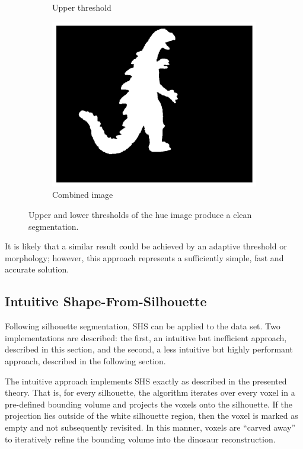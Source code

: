 \begin{figure}[ht]
\begin{subfigure}[b]{0.25\textwidth}
    \caption{Upper threshold}
  \end{subfigure}
  \hspace{1em}
  \begin{subfigure}[b]{0.25\textwidth}
    \centering
    \includegraphics[width=\textwidth]{images/q2_masked_img_3.png}
    \caption{Combined image}
  \end{subfigure}
  \caption{Upper and lower thresholds of the hue image produce a clean segmentation.}
  \label{fig:thresholds}
\end{figure}

It is likely that a similar result could be achieved by an adaptive threshold or morphology; however, this approach represents a sufficiently simple, fast and accurate solution.

\newpage
\subsection{Intuitive Shape-From-Silhouette}

Following silhouette segmentation, SHS can be applied to the data set. Two implementations are described: the first, an intuitive but inefficient approach, described in this section, and the second, a less intuitive but highly performant approach, described in the following section.

The intuitive approach implements SHS exactly as described in the presented theory. That is, for every silhouette, the algorithm iterates over every voxel in a pre-defined bounding volume and projects the voxels onto the silhouette. If the projection lies outside of the white silhouette region, then the voxel is marked as empty and not subsequently revisited. In this manner, voxels are ``carved away'' to iteratively refine the bounding volume into the dinosaur reconstruction.

